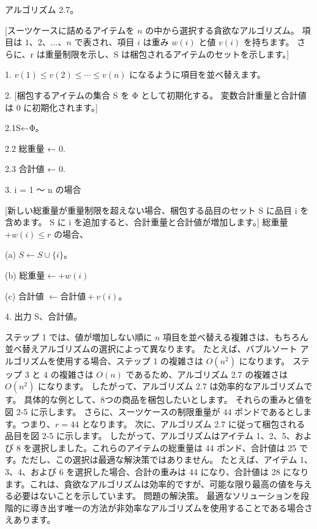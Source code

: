 
アルゴリズム 2.7。

[スーツケースに詰めるアイテムを $n$ の中から選択する貪欲なアルゴリズム。 項目は $1、2、\dots、n$ で表され、項目 $i$ は重み $w(i)$ と値 $v(i)$ を持ちます。 さらに、r は重量制限を示し、S は梱包されるアイテムのセットを示します。]

1. $v(1) \leq v(2) \leq \cdots \leq v(n)$ になるように項目を並べ替えます。

2. [梱包するアイテムの集合 S を Φ として初期化する。 変数合計重量と合計値は 0 に初期化されます。]

2.1S←Φ。

2.2 総重量 ← 0.

2.3 合計値 ← 0.

3. i = 1 ～ n の場合

[新しい総重量が重量制限を超えない場合、梱包する品目のセット S に品目 i を含めます。 S に i を追加すると、合計重量と合計値が増加します。]
総重量 $+ w(i) \leq r$ の場合、

(a) $S ← S \cup \{i\}$。

(b) 総重量$ ← +w(i)$

(c) 合計値 $← 合計値 + v(i)$。

4. 出力 S、合計値。

ステップ 1 では、値が増加しない順に $n$ 項目を並べ替える複雑さは、もちろん並べ替えアルゴリズムの選択によって異なります。 たとえば、バブルソート アルゴリズムを使用する場合、ステップ 1 の複雑さは $O(n^2)$ になります。 ステップ 3 と 4 の複雑さは $O(n)$ であるため、アルゴリズム 2.7 の複雑さは $O(n^2)$ になります。 したがって、アルゴリズム 2.7 は効率的なアルゴリズムです。
具体的な例として、8つの商品を梱包したいとします。 それらの重みと値を図 2-5 に示します。 さらに、スーツケースの制限重量が 44 ポンドであるとします。つまり、$r=44$ となります。 次に、アルゴリズム 2.7 に従って梱包される品目を図 2-5 に示します。
したがって、アルゴリズムはアイテム 1、2、5、および 8 を選択しました。これらのアイテムの総重量は 44 ポンド、合計値は 25 です。ただし、この選択は最適な解決策ではありません。 たとえば、アイテム 1、3、4、および 6 を選択した場合、合計の重みは 44 になり、合計値は 28 になります。これは、貪欲なアルゴリズムは効率的ですが、可能な限り最高の値を与える必要はないことを示しています。 問題の解決策。 最適なソリューションを段階的に導き出す唯一の方法が非効率なアルゴリズムを使用することである場合さえあります。